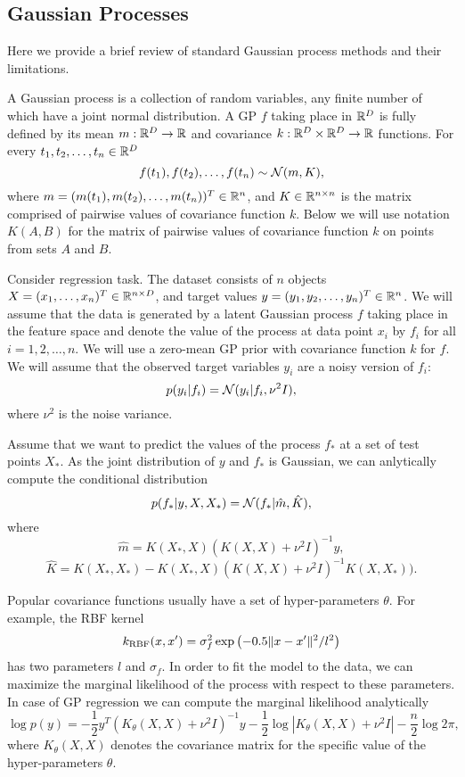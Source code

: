\subsection{Gaussian Processes} 
  Here we provide a brief review of standard Gaussian process methods and their
  limitations. 
  
  A Gaussian process is a collection of random variables, any finite number of 
  which have a joint normal distribution. A GP $f$ taking place in $\mathbb{R}^D$ is 
  fully defined by its mean $m: \mathbb{R}^D \rightarrow \mathbb{R}$ and covariance 
  $k: \mathbb{R}^D \times \mathbb{R}^D \rightarrow \mathbb{R}$ functions. For every $t_1, t_2, \ldots, t_n \in \mathbb{R}^D$
  \[
    f(t_1), f(t_2), \ldots, f(t_n) \sim \mathcal{N}(m, K),
  \]
  where $m = (m(t_1), m(t_2), \ldots, m(t_n))^T \in \mathbb{R}^n$, and 
  $K\in \mathbb{R}^{n \times n}$ is the matrix comprised of pairwise values of covariance
  function $k$. Below we will use notation $K(A, B)$ for the matrix of pairwise
  values of covariance function $k$ on points from sets $A$ and $B$.

  Consider regression task. The dataset  consists of 
  $n$ objects $X = (x_1, \ldots, x_n)^T \in \mathbb{R}^{n \times D}$, and target values
  $y = (y_1, y_2, \ldots, y_n)^T \in \mathbb{R}^n$. We will assume that the data is 
  generated by a latent Gaussian process $f$ taking place in the feature space
  and denote the value of the process at data point $x_i$ by $f_i$ for all 
  $i = 1, 2, \ldots, n$. We will use a zero-mean GP prior with covariance function
  $k$ for $f$. We will assume that the observed target variables $y_i$
  are a noisy version of $f_i$:
  \[
    p(y_i | f_i) = \mathcal{N}(y_i | f_i, \nu^2 I),
  \]
  where $\nu^2$ is the noise variance.

  Assume that we want to predict the values of the process $f_*$ at a set of test
  points
  $X_*$. As the joint distribution of $y$ and $f_*$ is Gaussian, we can anlytically
  compute the conditional distribution
  \[
    p(f_* | y, X, X_*) = \mathcal{N}(f_* | \hat m, \hat K),
  \]
  where
  \[
      \hat m = K(X_*, X) (K(X, X) + \nu^2 I)^{-1} y,
  \]
  \[
      \hat K = K(X_*, X_*) - K(X_*, X)(K(X, X) + \nu^2 I)^{-1} K(X, X_*)).
  \]
 
  Popular covariance functions usually have a set of hyper-parameters $\theta$.
  For example, the RBF kernel
  \[
    k_{\mbox{\scriptsize RBF}} (x, x') = \sigma_f^2 \exp\left(- 0.5 \Vert x - x'\Vert^2 / l^2 \right)
  \]
  has two parameters $l$ and $\sigma_f$. In order to fit the model to the data, 
  we can maximize the marginal likelihood of the process with respect to these
  parameters. In case of GP regression we can compute the marginal likelihood
  analytically
  \[
    \log p(y) = -\frac 1 2 y^T (K_{\theta}(X, X) + \nu^2 I)^{-1} y -
    \frac 1 2 \log |K_{\theta} (X, X) + \nu^2 I| - \frac n 2 \log 2 \pi,
  \]
  where $K_{\theta}(X, X)$ denotes the covariance matrix for the specific 
  value of the hyper-parameters $\theta$.

